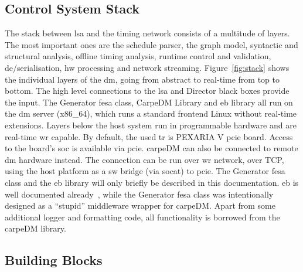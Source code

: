 \subsection{Control System Stack}
The stack between \gls{lsa} and the timing network consists of a multitude of layers. The most important ones are the schedule parser, the graph model, syntactic and structural analysis, offline timing analysis, runtime control and validation, de/serialisation, \gls{hw} processing and network streaming.
Figure~\ref{fig:stack} shows the individual layers of the \gls{dm}, going from abstract to real-time from top to bottom. The high level connections to the \gls{lsa} and Director black boxes provide the input.
The Generator \gls{fesa} class, CarpeDM Library and \gls{eb} library all run on the \gls{dm} server (x86\_64), which runs a standard frontend Linux without real-time extensions. Layers below the host system run in programmable hardware and are real-time
\gls{wr} capable. By default, the used \gls{tr} is PEXARIA V \gls{pcie} board. Access to the board's \gls{soc} is available via \gls{pcie}. carpeDM can also be connected to remote \gls{dm} hardware instead. The connection can be run over \gls{wr} network, over TCP, using the host platform as a \gls{sw} bridge (via socat) to \gls{pcie}. The Generator \gls{fesa} class and the \gls{eb} library will only briefly be described in this documentation. \gls{eb} is well documented already~\cite{terpstra_etherbone_2012}, while the Generator
\gls{fesa} class was intentionally designed as a \enquote{stupid} middleware wrapper for carpeDM. Apart from some additional logger and formatting code, all functionality is borrowed from the carpeDM library.


\subsection{Building Blocks}

